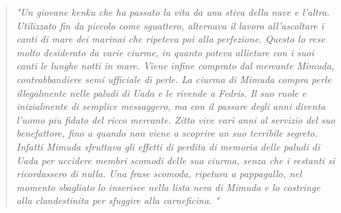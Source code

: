 \documentclass[11pt]{article}
\begin{document}
 \vspace{0.5cm}
 \begin{quote}
 \textit{\Fontauri"Un giovane kenku che ha passato la vita da una stiva della nave e l'altra. Utilizzato fin da piccolo come sguattero, alternava il lavoro all'ascoltare i canti di mare dei marinai che ripeteva poi alla perfezione. Questo lo rese molto desiderato da varie ciurme, in quanto poteva allietare con i suoi canti le lunghe notti in mare. Viene infine comprato dal mercante Mimuda, contrabbandiere semi ufficiale di perle. La ciurma di Mimuda compra perle illegalmente nelle paludi di Uada e le rivende a Fedris. Il suo ruole e inizialmente di semplice messaggero, ma con il passare degli anni diventa l'uomo piu fidato del ricco mercante. Zitto vive vari anni al servizio del suo benefattore, fino a quando non viene a scoprire un suo terribile segreto. Infatti Mimuda sfruttava gli effetti di perdita di memoria delle paludi di Uada per uccidere membri scomodi delle sua ciurma, senza che i restanti si ricordassero di nulla. Una frase scomoda, ripetura a pappagallo, nel momento sbagliato lo inserisce nella lista nera di Mimuda e lo costringe alla clandestinita per sfuggire alla carneficina.  "}  
 \end{quote}
\end{document}
